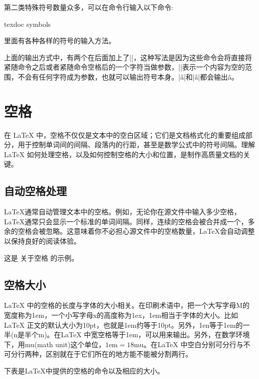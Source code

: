 {第二类特殊符号数量众多，可以在命令行输入以下命令:
\begin{shellcmd}
	texdoc symbols
\end{shellcmd}

里面有各种各样的符号的输入方法。

上面的输出方式中，有两个在后面加上了\texinline|{}|，这种写法是因为这些命令会将直接将紧随命令之后或者紧随命令空格后的一个字符当做参数，\texinline|{}|表示一个内容为空的范围，不会有任何字符成为参数，也就可以输出符号本身。\texinline|\^ a|和\texinline|\^a|都会输出\^a。

\section{空格}
在 LaTeX 中，空格不仅仅是文本中的空白区域；它们是文档格式化的重要组成部分，用于控制单词间的间隔、段落内的行距，甚至是数学公式中的符号间隔。理解 LaTeX 如何处理空格，以及如何控制空格的大小和位置，是制作高质量文档的关键。
\subsection{自动空格处理}
\LaTeX 通常自动管理文本中的空格。例如，无论你在源文件中输入多少空格，\LaTeX 通常只会显示一个标准的单词间隔。同样，连续的空格会被合并成一个，多余的空格会被忽略。这意味着你不必担心源文件中的空格数量，\LaTeX 会自动调整以保持良好的阅读体验。
\begin{texlst}
	这是 关于空格    的示例。
\end{texlst}

\subsection{空格大小}
\LaTeX
中的空格的长度与字体的大小相关。在印刷术语中，把一个大写字母M的宽度称为1em，一个小写字母x的高度称为1ex，1em相当于字体的大小。比如\LaTeX
正文的默认大小为10pt，也就是1em约等于10pt。另外，1en等于1em的一半(n是半个m)。在\LaTeX
中宽空格等于1em，可以用\texinline{\quad}来输出。另外，在数学环境下，用mu(math unit)这个单位，$1\text{em}=18\text{mu}$。在\LaTeX
中空白分别可分行与不可分行两种，区别就在于它们所在的地方能不能被分割两行。

下表是\LaTeX 中提供的空格的命令以及相应的大小。

}
